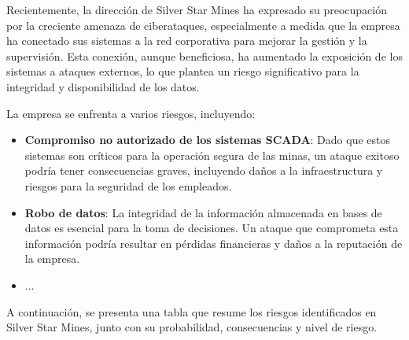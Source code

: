 Recientemente, la dirección de Silver Star Mines ha expresado su preocupación por la creciente amenaza de ciberataques, especialmente a medida que la empresa ha conectado sus sistemas a la red corporativa para mejorar la gestión y la supervisión. Esta conexión, aunque beneficiosa, ha aumentado la exposición de los sistemas a ataques externos, lo que plantea un riesgo significativo para la integridad y disponibilidad de los datos.

La empresa se enfrenta a varios riesgos, incluyendo:
\begin{itemize}
    \item \textbf{Compromiso no autorizado de los sistemas SCADA}: Dado que estos sistemas son críticos para la operación segura de las minas, un ataque exitoso podría tener consecuencias graves, incluyendo daños a la infraestructura y riesgos para la seguridad de los empleados.
    \item \textbf{Robo de datos}: La integridad de la información almacenada en bases de datos es esencial para la toma de decisiones. Un ataque que comprometa esta información podría resultar en pérdidas financieras y daños a la reputación de la empresa.
    \item ...
\end{itemize}

A continuación, se presenta una tabla que resume los riesgos identificados en Silver Star Mines, junto con su probabilidad, consecuencias y nivel de riesgo.

